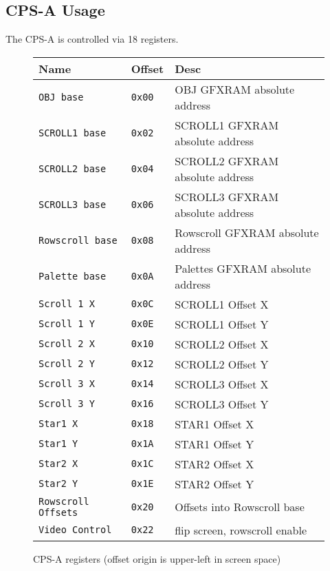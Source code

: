 \subsection{CPS-A Usage}

The CPS-A is controlled via 18 registers.

 \begin{figure}[H]
\begin{tabularx}{\textwidth}{llX}
  \toprule    
  \textbf{Name } & \textbf{ Offset }  & \textbf{Desc }  \\     
  \toprule   
  \texttt{OBJ base}  &  \texttt{0x00} & OBJ GFXRAM absolute address   \\   
\texttt{SCROLL1 base} &  \texttt{0x02}  & SCROLL1 GFXRAM absolute address   \\         
\texttt{SCROLL2 base} &  \texttt{0x04}  & SCROLL2 GFXRAM absolute address   \\     
\texttt{SCROLL3 base}&  \texttt{0x06}   & SCROLL3 GFXRAM absolute address  \\     
\texttt{Rowscroll base} &  \texttt{0x08}  & Rowscroll GFXRAM absolute address \\     
\texttt{Palette base} &  \texttt{0x0A}  & Palettes GFXRAM absolute address  \\   
  \toprule   
\texttt{Scroll 1 X} &  \texttt{0x0C}  & SCROLL1 Offset X  \\ 
\texttt{Scroll 1 Y} &  \texttt{0x0E}  & SCROLL1 Offset Y    \\   
\texttt{Scroll 2 X} &  \texttt{0x10}  & SCROLL2 Offset X    \\ 
\texttt{Scroll 2 Y} &  \texttt{0x12}  & SCROLL2 Offset Y    \\   
\texttt{Scroll 3 X} &  \texttt{0x14}  & SCROLL3 Offset X    \\ 
\texttt{Scroll 3 Y} &  \texttt{0x16}  & SCROLL3 Offset Y    \\     
  \toprule   
\texttt{Star1    X} &  \texttt{0x18}  & STAR1   Offset X    \\  
\texttt{Star1    Y} &  \texttt{0x1A}  & STAR1   Offset Y    \\  
\texttt{Star2    X} &  \texttt{0x1C}  & STAR2   Offset X    \\  
\texttt{Star2    Y} &  \texttt{0x1E}  & STAR2   Offset Y    \\  
  \toprule   
\texttt{Rowscroll Offsets} &  \texttt{0x20}  & Offsets into Rowscroll base\\
\texttt{Video Control} &  \texttt{0x22}  & flip screen, rowscroll enable\\
  \toprule   
\end{tabularx}
\caption*{CPS-A registers (offset origin is upper-left in screen space)}
\end{figure}

